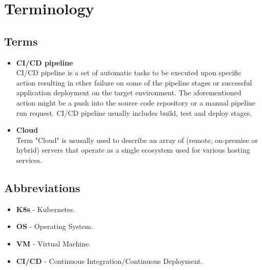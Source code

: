 \chapter*{Terminology}


\section*{Terms}

\begin{itemize}
    \setlength\itemsep{1px}
    \item \textbf{CI/CD pipeline} \\
    CI/CD pipeline is a set of automatic tasks to be executed upon specific action resulting in ether failure on some of the pipeline stages or successful application deployment on the target environment. The aforementioned action might be a push into the source code repository or a manual pipeline run request. CI/CD pipeline usually includes build, test and deploy stages.
    \setlength\itemsep{1px}
    \item \textbf{Cloud} \\
    Term "Cloud" is ususally used to describe an array of (remote, on-premise or hybrid) servers that operate as a single ecosystem used for various hosting services.
\end{itemize}

\section*{Abbreviations}

\begin{itemize}
    \setlength\itemsep{1px}
    \item \textbf{K8s} - Kubernetes.
    \item \textbf{OS} - Operating System.
    \item \textbf{VM} - Virtual Machine.
    \item \textbf{CI/CD} - Continuous Integration/Continuous Deployment.
\end{itemize}



